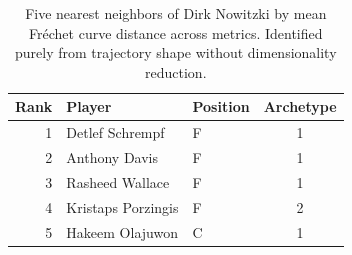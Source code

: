 \begin{table}[htbp]
  \centering\small
  \begin{tabular}{rllc}
    \toprule
    Rank & Player & Position & Archetype \\
    \midrule
    1 & Detlef Schrempf & F & 1 \\
    2 & Anthony Davis & F & 1 \\
    3 & Rasheed Wallace & F & 1 \\
    4 & Kristaps Porzingis & F & 2 \\
    5 & Hakeem Olajuwon & C & 1 \\
    \bottomrule
  \end{tabular}
  \caption{Five nearest neighbors of Dirk Nowitzki by mean Fr\'{e}chet curve distance across metrics. Identified purely from trajectory shape without dimensionality reduction.}
  \label{tab:Dirk_Nowitzki_frechet_curve_neighbors}
\end{table}


